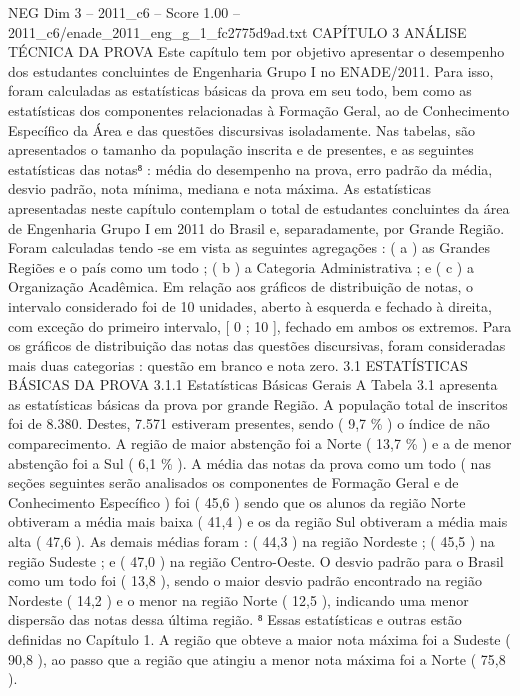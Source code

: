 \begin{textsample}{NEG Dim 3 – 2011\_c6 – Score 1.00 – 2011\_c6/enade\_2011\_eng\_g\_1\_fc2775d9ad.txt}  \label{ex:f3_neg_079}
CAPÍTULO 3 ANÁLISE TÉCNICA DA PROVA Este capítulo tem por objetivo apresentar o desempenho dos estudantes concluintes de Engenharia Grupo I no ENADE/2011.
Para isso, foram calculadas as estatísticas básicas da prova em seu todo, bem como as estatísticas dos componentes relacionadas à Formação Geral, ao de Conhecimento Específico da Área e das questões discursivas isoladamente.
Nas tabelas, são apresentados o tamanho da população inscrita e de presentes, e as seguintes estatísticas das notas⁸ : média do desempenho na prova, erro padrão da média, desvio padrão, nota mínima, mediana e nota máxima.
As estatísticas apresentadas neste capítulo contemplam o total de estudantes concluintes da área de Engenharia Grupo I em 2011 do Brasil e, separadamente, por Grande Região.
Foram calculadas tendo -se em vista as seguintes agregações : ( a ) as Grandes Regiões e o país como um todo ; ( b ) a Categoria Administrativa ; e ( c ) a Organização Acadêmica.
Em relação aos gráficos de distribuição de notas, o intervalo considerado foi de 10 unidades, aberto à esquerda e fechado à direita, com exceção do primeiro intervalo, [ 0 ; 10 ], fechado em ambos os extremos.
Para os gráficos de distribuição das notas das questões discursivas, foram consideradas mais duas categorias : questão em branco e nota zero. 3.1 ESTATÍSTICAS BÁSICAS DA PROVA 3.1.1 Estatísticas Básicas Gerais A Tabela 3.1 apresenta as estatísticas básicas da prova por grande Região.
A população total de inscritos foi de 8.380.
Destes, 7.571 estiveram presentes, sendo ( 9,7 \% ) o índice de não comparecimento.
A região de maior abstenção foi a Norte ( 13,7 \% ) e a de menor abstenção foi a Sul ( 6,1 \% ).
A média das notas da prova como um todo ( nas seções seguintes serão analisados os componentes de Formação Geral e de Conhecimento Específico ) foi ( 45,6 ) sendo que os alunos da região Norte obtiveram a média mais baixa ( 41,4 ) e os da região Sul obtiveram a média mais alta ( 47,6 ).
As demais médias foram : ( 44,3 ) na região Nordeste ; ( 45,5 ) na região Sudeste ; e ( 47,0 ) na região Centro-Oeste.
O desvio padrão para o Brasil como um todo foi ( 13,8 ), sendo o maior desvio padrão encontrado na região Nordeste ( 14,2 ) e o menor na região Norte ( 12,5 ), indicando uma menor dispersão das notas dessa última região. ⁸ Essas estatísticas e outras estão definidas no Capítulo 1.
A região que obteve a maior nota máxima foi a Sudeste ( 90,8 ), ao passo que a região que atingiu a menor nota máxima foi a Norte ( 75,8 ).

\end{textsample}
